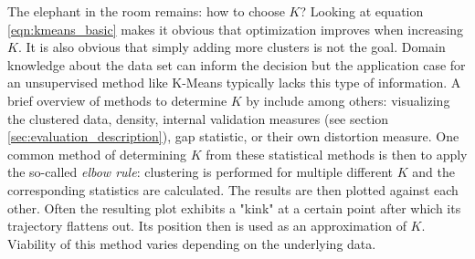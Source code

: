 The elephant in the room remains: how to choose $K$? Looking at equation \ref{eqn:kmeans_basic} makes it obvious that optimization improves when increasing $K$. It is also obvious that simply adding more clusters is not the goal. Domain knowledge about the data set can inform the decision but the application case for an unsupervised method like K-Means typically lacks this type of information. A brief overview of methods to determine $K$ by \cite{pham2005selection, yuan2019research} include among others: visualizing the clustered data, density, internal validation measures (see section \ref{sec:evaluation_description}), gap statistic, or their own distortion measure. One common method of determining $K$ from these statistical methods is then to apply the so-called \textit{elbow rule}: clustering is performed for multiple different $K$ and the corresponding statistics are calculated. The results are then plotted against each other. Often the resulting plot exhibits a "kink" at a certain point after which its trajectory flattens out. Its position then is used as an approximation of $K$. Viability of this method varies depending on the underlying data.